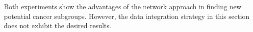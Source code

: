 Both experiments show the advantages of the network approach in finding new potential cancer subgroups. However, the data integration strategy in this section does not exhibit the desired results.


